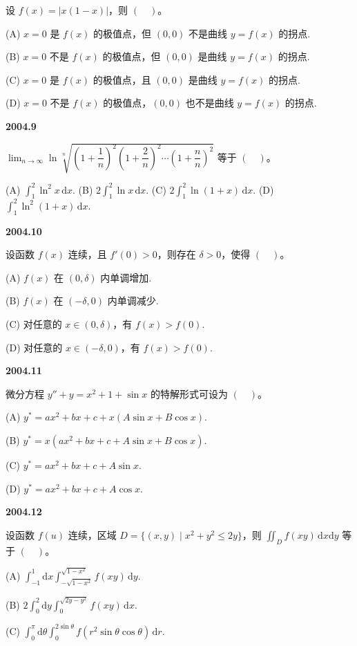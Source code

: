 \documentclass[UTF8,12pt,fontset=windows]{ctexart}
\begin{document}
设 $f(x)=|x(1-x)|$，则 $(\quad)$。

(A) $x=0$ 是 $f(x)$ 的极值点，但 $(0,0)$ 不是曲线 $y=f(x)$ 的拐点.

(B) $x=0$ 不是 $f(x)$ 的极值点，但 $(0,0)$ 是曲线 $y=f(x)$ 的拐点.

(C) $x=0$ 是 $f(x)$ 的极值点，且 $(0,0)$ 是曲线 $y=f(x)$ 的拐点.

(D) $x=0$ 不是 $f(x)$ 的极值点，$(0,0)$ 也不是曲线 $y=f(x)$ 的拐点.

\vfill
\newpage
{\large\bfseries 2004.9}

$\lim_{n\to\infty}\ln\sqrt[n]{\left(1+\dfrac{1}{n}\right)^2\left(1+\dfrac{2}{n}\right)^2\cdots\left(1+\dfrac{n}{n}\right)^2}$ 等于 $(\quad)$。

(A) $\displaystyle\int_1^2\ln^2x\,\mathrm{d}x$.  (B) $\displaystyle2\int_1^2\ln x\,\mathrm{d}x$.  (C) $\displaystyle2\int_1^2\ln(1+x)\,\mathrm{d}x$.  (D) $\displaystyle\int_1^2\ln^2(1+x)\,\mathrm{d}x$.

\vfill
\newpage
{\large\bfseries 2004.10}

设函数 $f(x)$ 连续，且 $f'(0)>0$，则存在 $\delta>0$，使得 $(\quad)$。

(A) $f(x)$ 在 $(0,\delta)$ 内单调增加.

(B) $f(x)$ 在 $(-\delta,0)$ 内单调减少.

(C) 对任意的 $x\in(0,\delta)$，有 $f(x)>f(0)$.

(D) 对任意的 $x\in(-\delta,0)$，有 $f(x)>f(0)$.

\vfill
\newpage
{\large\bfseries 2004.11}

微分方程 $y''+y=x^2+1+\sin x$ 的特解形式可设为 $(\quad)$。

(A) $y^*=ax^2+bx+c+x(A\sin x+B\cos x)$.

(B) $y^*=x(ax^2+bx+c+A\sin x+B\cos x)$.

(C) $y^*=ax^2+bx+c+A\sin x$.

(D) $y^*=ax^2+bx+c+A\cos x$.

\vfill
\newpage
{\large\bfseries 2004.12}

设函数 $f(u)$ 连续，区域 $D=\{(x,y)\mid x^2+y^2\le2y\}$，则 $\displaystyle\iint_D f(xy)\,\mathrm{d}x\mathrm{d}y$ 等于 $(\quad)$。

(A) $\displaystyle\int_{-1}^1\mathrm{d}x\int_{-\sqrt{1-x^2}}^{\sqrt{1-x^2}}f(xy)\,\mathrm{d}y$.

(B) $\displaystyle2\int_0^2\mathrm{d}y\int_0^{\sqrt{2y-y^2}}f(xy)\,\mathrm{d}x$.

(C) $\displaystyle\int_0^\pi\mathrm{d}\theta\int_0^{2\sin\theta}f(r^2\sin\theta\cos\theta)\,\mathrm{d}r$.
\end{document}
